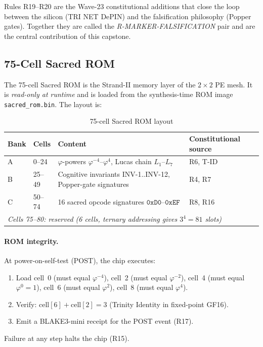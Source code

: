 \begin{remark}
Rules R19--R20 are the Wave-23 constitutional additions that close the
loop between the silicon (TRI NET DePIN) and the falsification
philosophy (Popper gates).  Together they are called the
\emph{R-MARKER-FALSIFICATION} pair and are the central contribution of
this capstone.
\end{remark}

\subsection{75-Cell Sacred ROM}
\label{sec74:sacred-rom}

The 75-cell Sacred ROM is the Strand-II memory layer of the $2{\times}2$
PE mesh.  It is \emph{read-only at runtime} and is loaded from the
synthesis-time ROM image \texttt{sacred\_rom.bin}.  The layout is:

\begin{table}[H]
\centering
\caption{75-cell Sacred ROM layout}
\label{tab74:sacred-rom}
\small
\begin{tabular}{llll}
\toprule
Bank & Cells & Content & Constitutional source \\
\midrule
A & 0--24  & $\varphi$-powers $\varphi^{-4}$--$\varphi^{4}$, Lucas chain $L_1$--$L_7$ & R6, T-ID \\
B & 25--49 & Cognitive invariants INV-1..INV-12, Popper-gate signatures & R4, R7 \\
C & 50--74 & 16 sacred opcode signatures $\mathtt{0xD0}$--$\mathtt{0xEF}$ & R8, R16 \\
\midrule
\multicolumn{4}{l}{\textit{Cells 75--80: reserved (6 cells, ternary addressing gives $3^4=81$ slots)}} \\
\bottomrule
\end{tabular}
\end{table}

\paragraph{ROM integrity.}
At power-on-self-test (POST), the chip executes:
\begin{enumerate}
  \item Load cell~0 (must equal $\varphi^{-4}$), cell~2 (must equal
    $\varphi^{-2}$), cell~4 (must equal $\varphi^{0}=1$), cell~6
    (must equal $\varphi^{2}$), cell~8 (must equal $\varphi^{4}$).
  \item Verify: $\mathrm{cell}[6]+\mathrm{cell}[2] = 3$ (Trinity Identity
    in fixed-point GF16).
  \item Emit a BLAKE3-mini receipt for the POST event (R17).
\end{enumerate}
Failure at any step halts the chip (R15).

